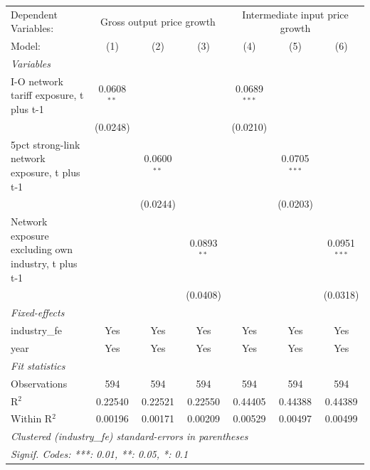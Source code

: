 \begingroup
\centering
\begin{tabular}{lcccccc}
   \tabularnewline \midrule \midrule
   Dependent Variables: & \multicolumn{3}{c}{Gross output price growth} & \multicolumn{3}{c}{Intermediate input price growth}\\
   Model:                                              & (1)           & (2)           & (3)           & (4)            & (5)            & (6)\\  
   \midrule
   \emph{Variables}\\
   I-O network tariff exposure, t plus t-1             & 0.0608$^{**}$ &               &               & 0.0689$^{***}$ &                &   \\   
                                                       & (0.0248)      &               &               & (0.0210)       &                &   \\   
   5pct strong-link network exposure, t plus t-1       &               & 0.0600$^{**}$ &               &                & 0.0705$^{***}$ &   \\   
                                                       &               & (0.0244)      &               &                & (0.0203)       &   \\   
   Network exposure excluding own industry, t plus t-1 &               &               & 0.0893$^{**}$ &                &                & 0.0951$^{***}$\\   
                                                       &               &               & (0.0408)      &                &                & (0.0318)\\   
   \midrule
   \emph{Fixed-effects}\\
   industry\_fe                                        & Yes           & Yes           & Yes           & Yes            & Yes            & Yes\\  
   year                                                & Yes           & Yes           & Yes           & Yes            & Yes            & Yes\\  
   \midrule
   \emph{Fit statistics}\\
   Observations                                        & 594           & 594           & 594           & 594            & 594            & 594\\  
   R$^2$                                               & 0.22540       & 0.22521       & 0.22550       & 0.44405        & 0.44388        & 0.44389\\  
   Within R$^2$                                        & 0.00196       & 0.00171       & 0.00209       & 0.00529        & 0.00497        & 0.00499\\  
   \midrule \midrule
   \multicolumn{7}{l}{\emph{Clustered (industry\_fe) standard-errors in parentheses}}\\
   \multicolumn{7}{l}{\emph{Signif. Codes: ***: 0.01, **: 0.05, *: 0.1}}\\
\end{tabular}
\par\endgroup
